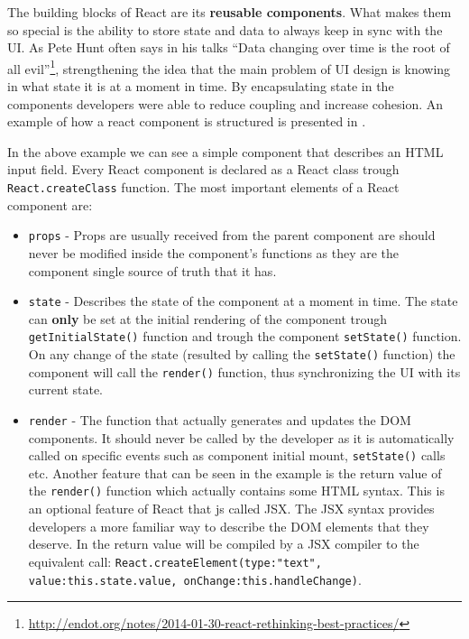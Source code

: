 The building blocks of React are its \textbf{reusable components}. What makes them so special is the ability to store state and data to always keep in sync with the UI. As Pete Hunt often says in his talks ``Data changing over time is the root of all evil''\footnote{\url{http://endot.org/notes/2014-01-30-react-rethinking-best-practices/}}, strengthening the idea that the main problem of UI design is knowing in what state it is at a moment in time. By encapsulating state in the components developers were able to reduce coupling and increase cohesion. An example of how a react component is structured is presented in .



In the above example we can see a simple component that describes an HTML input field. Every React component is declared as a React class trough \texttt{React.createClass} function. The most important elements of a React component are:
\begin{itemize}
	\item \texttt{props} - Props are usually received from the parent component are should never be modified inside the component's functions as they are the component single source of truth that it has.
	\item \texttt{state} - Describes the state of the component at a moment in time. The state can \textbf{only} be set at the initial rendering of the component trough \texttt{getInitialState()} function and trough the component \texttt{setState()} function. On any change of the state (resulted by calling the \texttt{setState()} function) the component will call the \texttt{render()} function, thus synchronizing the UI with its current state.
	\item \texttt{render} - The function that actually generates and updates the DOM components. It should never be called by the developer as it is automatically called on specific events such as component initial mount, \texttt{setState()} calls etc. Another feature that can be seen in the example is the return value of the \texttt{render()} function which actually contains some HTML syntax. This is an optional feature of React that js called JSX. The JSX syntax provides developers a more familiar way to describe the DOM elements that they deserve. In  the return value will be compiled by a JSX compiler to the equivalent call:
	\texttt{React.createElement(type:"text", value:this.state.value, onChange:this.handleChange)}.
\end{itemize}

